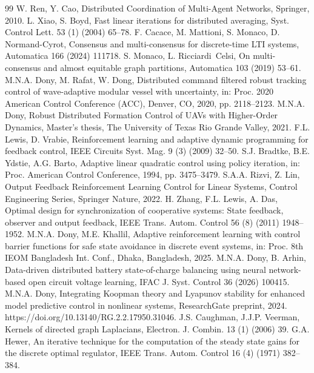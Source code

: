 \documentclass[12pt]{elsarticle}
\theoremstyle{remark}
\begin{document}
\begin{thebibliography}{99}
W. Ren, Y. Cao, Distributed Coordination of Multi-Agent Networks, Springer, 2010.
L. Xiao, S. Boyd, Fast linear iterations for distributed averaging, Syst. Control Lett. 53 (1) (2004) 65--78.
F. Cacace, M. Mattioni, S. Monaco, D. Normand-Cyrot, Consensus and multi-consensus for discrete-time LTI systems, Automatica 166 (2024) 111718.
S. Monaco, L. Ricciardi~Celsi, On multi-consensus and almost equitable graph partitions, Automatica 103 (2019) 53--61.
M.N.A. Dony, M. Rafat, W. Dong, Distributed command filtered robust tracking control of wave-adaptive modular vessel with uncertainty, in: Proc. 2020 American Control Conference (ACC), Denver, CO, 2020, pp. 2118--2123.
M.N.A. Dony, Robust Distributed Formation Control of UAVs with Higher-Order Dynamics, Master's thesis, The University of Texas Rio Grande Valley, 2021.
F.L. Lewis, D. Vrabie, Reinforcement learning and adaptive dynamic programming for feedback control, IEEE Circuits Syst. Mag. 9 (3) (2009) 32--50.
S.J. Bradtke, B.E. Ydstie, A.G. Barto, Adaptive linear quadratic control using policy iteration, in: Proc. American Control Conference, 1994, pp. 3475--3479.
S.A.A. Rizvi, Z. Lin, Output Feedback Reinforcement Learning Control for Linear Systems, Control Engineering Series, Springer Nature, 2022.
H. Zhang, F.L. Lewis, A. Das, Optimal design for synchronization of cooperative systems: State feedback, observer and output feedback, IEEE Trans. Autom. Control 56 (8) (2011) 1948--1952.
M.N.A. Dony, M.E. Khallil, Adaptive reinforcement learning with control barrier functions for safe state avoidance in discrete event systems, in: Proc. 8th IEOM Bangladesh Int. Conf., Dhaka, Bangladesh, 2025.
M.N.A. Dony, B. Arhin, Data-driven distributed battery state-of-charge balancing using neural network-based open circuit voltage learning, IFAC J. Syst. Control 36 (2026) 100415.
M.N.A. Dony, Integrating Koopman theory and Lyapunov stability for enhanced model predictive control in nonlinear systems, ResearchGate preprint, 2024. https://doi.org/10.13140/RG.2.2.17950.31046.
J.S. Caughman, J.J.P. Veerman, Kernels of directed graph Laplacians, Electron. J. Combin. 13 (1) (2006) 39.
G.A. Hewer, An iterative technique for the computation of the steady state gains for the discrete optimal regulator, IEEE Trans. Autom. Control 16 (4) (1971) 382--384.
\end{thebibliography}
\end{document}
